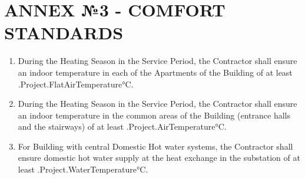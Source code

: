 \section{ANNEX №3 {-} COMFORT STANDARDS}

\begin{enumerate}[label=\arabic*.]
	\item During the Heating Season in the Service Period, the Contractor shall ensure an indoor temperature in each of the Apartments of the Building of at least \iffalse input project.flat_airtemp value="{{.Project.FlatAirTemperature}}" \fi {{.Project.FlatAirTemperature}}°C.

	\item During the Heating Season in the Service Period, the Contractor shall ensure an indoor temperature in the common areas of the Building (entrance halls and the stairways) of at least \iffalse input project.airtemp value="{{.Project.AirTemperature}}" \fi {{.Project.AirTemperature}}°C.

  \item For Building with central Domestic Hot water systems, the Contractor shall ensure domestic hot water supply at the heat exchange in the substation of at least \iffalse input project.watertemp value="{{.Project.WaterTemperature}}" \fi {{.Project.WaterTemperature}}°C.
\end{enumerate}
